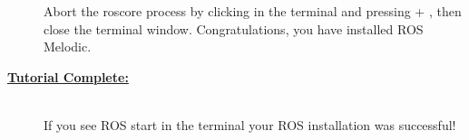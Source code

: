 \documentclass[12pt]{article}
\begin{document}
\begin{description}
Abort the roscore process by clicking in the terminal and pressing \CTRLKey + \CKey, then close the terminal window. Congratulations, you have installed ROS Melodic.

\item[\textbf{\underline{Tutorial Complete:}}] \hfill \vspace{3mm}\\

If you see ROS start in the terminal your ROS installation was successful!


\end{description}
\end{document}
